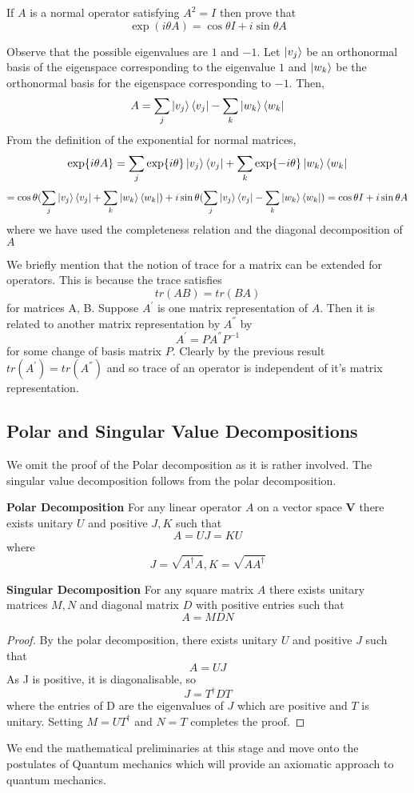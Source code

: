 \begin{exercise}
If $A$ is a normal operator satisfying $A^2 = I$ then prove that 
$$ \exp(i\theta A) = \cos{\theta}I + i\sin{\theta}A$$
\end{exercise}
\begin{solution}
Observe that the possible eigenvalues are $1$ and $-1$. Let $\ket{v_j}$ be an orthonormal basis of the eigenspace corresponding to the eigenvalue $1$ and $\ket{w_k}$ be the orthonormal basis for the eigenspace corresponding to $-1$. Then, 
$$ A = \sum_j \ket{v_j}\bra{v_j} - \sum_k \ket{w_k}\bra{w_k} $$
From the definition of the exponential for normal matrices,
$$\exp{i\theta A} = \sum_j \exp{i\theta }\ket{v_j}\bra{v_j} + \sum_k \exp{-i\theta}\ket{w_k}\bra{w_k}$$ 
$$ = \cos{\theta}(  \sum_j \ket{v_j}\bra{v_j} + \sum_k \ket{w_k}\bra{w_k}) + i\sin{\theta}( \sum_j \ket{v_j}\bra{v_j} - \sum_k \ket{w_k}\bra{w_k}) =  \cos{\theta}I + i\sin{\theta}A $$ where we have used the completeness relation and the diagonal decomposition of $A$
\end{solution}
We briefly mention that the notion of trace for a matrix can be extended for operators. This is because the trace satisfies
$$ tr(AB) = tr(BA) $$ for matrices A, B.
Suppose $A^{'}$ is one matrix representation of $A$. Then it is related to another matrix representation by $A^{''}$ by 
$$A^{'} = PA^{''}P^{-1}$$ for some change of basis matrix $P$.
Clearly by the previous  result $tr(A^{'}) = tr(A^{''})$ and so trace of an operator is independent of it's matrix representation.

\subsection{Polar and Singular Value Decompositions}
We omit the proof of the Polar decomposition as it is rather involved. The singular value decomposition follows from the polar decomposition.
\begin{theorem} \textbf{Polar Decomposition}
For any linear operator $A$ on a vector space $\textbf{V}$ there exists unitary $U$ and positive $J, K$ such that
$$A = UJ = KU$$ where
$$J = \sqrt{A^\dagger A}, K = \sqrt{AA^\dagger}$$
\end{theorem}

\begin{theorem} \textbf{Singular Decomposition}
For any square matrix $A$ there exists unitary matrices $M, N$ and diagonal matrix $D$ with positive entries such that
$$A = MDN $$
\end{theorem}
\begin{proof}
By the polar decomposition, there exists unitary $U$ and positive $J$ such that 
$$ A = UJ $$
As J is positive, it is diagonalisable, so $$J = T^\dagger DT$$ where the entries of D are the eigenvalues of $J$ which are positive and $T$ is unitary.
Setting $M = UT^\dagger$ and $N = T$ completes the proof.
\end{proof}

We end the mathematical preliminaries at this stage and move onto the postulates of Quantum mechanics which will provide an axiomatic approach to quantum mechanics.
\clearpage
